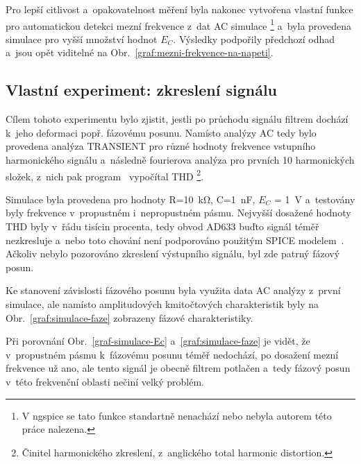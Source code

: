 \documentclass{protokol}
\begin{document}
		Pro lepší citlivost a~opakovatelnost měření byla nakonec vytvořena vlastní funkce pro automatickou detekci mezní frekvence z~dat AC simulace \footnote{V ngspice se tato funkce standartně nenachází nebo nebyla autorem této práce nalezena.} a~byla provedena simulace pro vyšší množství hodnot \(E_{C} \). Výsledky podpořily předchozí odhad a~jsou opět viditelné na Obr.~\ref{graf:mezni-frekvence-na-napeti}.

	\clearpage
	\subsection{Vlastní experiment: zkreslení signálu}
	\label{sekce:vlastni-experiment}
		Cílem tohoto experimentu bylo zjistit, jestli po průchodu signálu filtrem dochází k~jeho deformaci popř. fázovému posunu. Namísto analýzy AC tedy bylo provedena analýza TRANSIENT pro různé hodnoty frekvence vstupního harmonického signálu a~následně fourierova analýza pro prvních 10 harmonických složek, z~nich pak program~\cite{ngspice} vypočítal THD \footnote{Činitel harmonického zkreslení, z~anglického total harmonic distortion.}.

		Simulace byla provedena pro hodnoty R=\qty{10}{\kilo\ohm}, C=\qty{1}{\nano\farad}, \(E_{C} \) = \qty{1}{\volt} a~testovány byly frekvence v~propustném i~nepropustném pásmu. Nejvyšší dosažené hodnoty THD byly v~řádu tisícin procenta, tedy obvod AD633 buďto signál téměř nezkresluje a~nebo toto chování není podporováno použitým SPICE modelem~\cite{spicemodel}. Ačkoliv nebylo pozorováno zkreslení výstupního signálu, byl zde patrný fázový posun.
		
		Ke stanovení závislosti fázového posunu byla využita data AC analýzy z~první simulace, ale namísto amplitudových kmitočtových charakteristik byly na Obr.~\ref{graf:simulace-faze} zobrazeny fázové charakteristiky.

		Při porovnání Obr.~\ref{graf-simulace-Ec} a~\ref{graf:simulace-faze} je vidět, že v~propustném pásmu k~fázovému posunu téměř nedochází, po dosažení mezní frekvence už ano, ale tento signál je obecně filtrem potlačen a~tedy fázový posun v~této frekvenční oblasti nečiní velký problém.
\end{document}

